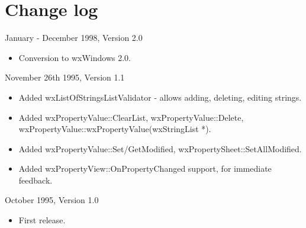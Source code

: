 \chapter{Change log}\label{changes}
%
\setfooter{\thepage}{}{}{}{}{\thepage}%

January - December 1998, Version 2.0

\begin{itemize}\itemsep=0pt
\item Conversion to wxWindows 2.0.
\end{itemize}

November 26th 1995, Version 1.1

\begin{itemize}\itemsep=0pt
\item Added wxListOfStringsListValidator - allows adding, deleting, editing
strings.
\item Added wxPropertyValue::ClearList, wxPropertyValue::Delete,
wxPropertyValue::wxPropertyValue(wxStringList *).
\item Added wxPropertyValue::Set/GetModified, wxPropertySheet::SetAllModified.
\item Added wxPropertyView::OnPropertyChanged support, for immediate feedback.
\end{itemize}

October 1995, Version 1.0

\begin{itemize}\itemsep=0pt
\item First release.
\end{itemize}

